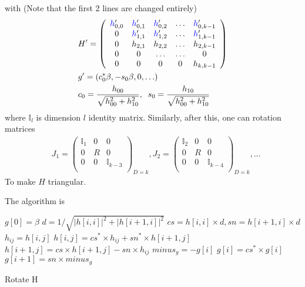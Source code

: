 with (Note that the first 2 lines are changed entirely)
\begin{equation}
\begin{split}
&H'=\left(\begin{array}{ccccc}
\textcolor[rgb]{0,0,1}{h}'_{0,0} & \textcolor[rgb]{0,0,1}{h}'_{0,1} & \textcolor[rgb]{0,0,1}{h}'_{0,2} & \ldots & \textcolor[rgb]{0,0,1}{h}'_{0,k-1} \\
0 & \textcolor[rgb]{0,0,1}{h}'_{1,1} &\textcolor[rgb]{0,0,1}{h}'_{1,2} & \ldots & \textcolor[rgb]{0,0,1}{h}'_{1,k-1} \\
0 & h_{2,1} & h_{2,2} & \ldots & h_{2,k-1} \\
0 & 0 & \ldots & \ldots & 0 \\
0 & 0 & 0 & 0 & h_{k,k-1} \\
\end{array}\right)\\
&g'=\left(c_0^*\beta,-s_0\beta,0,\ldots\right)\\
&c_0=\frac{h_{00}}{\sqrt{h_{00}^2+h_{10}^2}},\;\;s_0=\frac{h_{10}}{\sqrt{h_{00}^2+h_{10}^2}}
\end{split}
\end{equation}
where $\mathbb{I}_l$ is dimension $l$ identity matrix. Similarly, after this, one can rotation matrices
\begin{equation}
\begin{split}
&J_1=
{\left.\left(\begin{array}{ccc}
 \mathbb{I}_1 & 0 & 0 \\
0 & R & 0 \\
0 & 0 & \mathbb{I}_{k-3} \\
\end{array}\right)\right. }_{D=k},
J_2=
{\left.\left(\begin{array}{ccc}
 \mathbb{I}_2 & 0 & 0 \\
0 & R & 0 \\
0 & 0 & \mathbb{I}_{k-4} \\
\end{array}\right)\right. }_{D=k},\ldots
\end{split}
\end{equation}
To make $H$ triangular.

The algorithm is
\begin{algorithm}[H]
\begin{algorithmic}
\State $g[0]=\beta$
    \State $d=1 / \sqrt{|h[i,i]|^2+|h[i+1,i]|^2}$
    \State $cs=h[i,i] \times d,sn=h[i+1,i] \times d$
        \State $h_{ij}=h[i,j]$
        \State $h[i,j]=cs^* \times h_{ij}+ sn^* \times h[i+1,j]$
        \State $h[i+1,j]=cs \times h[i+1,j] - sn \times h_{ij}$
    \EndFor
    \State $minus_g=-g[i]$
    \State $g[i] = cs^* \times g[i]$
    \State $g[i+1] = sn \times minus_g$
\EndFor
\end{algorithmic}
\caption{\label{alg.GEMRES.RotateH}Rotate H}
\end{algorithm}

